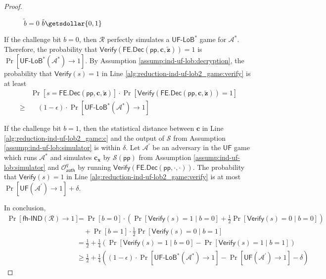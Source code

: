 \begin{proof}
\begin{figure}[h]
\begin{minipage}[t]{0.5\linewidth}
\begin{algorithm}[H]
\begin{algorithmic}[1]
		 \label{alg:reduction-ind-uf-lob2_game:verify}
			\State \Return $\tilde{b} = 0$
		\Else
			\State \Return $\tilde{b} \getsdollar \{0, 1\}$
		\EndIf

	\end{algorithmic}
	\end{algorithm}
	\end{minipage}
	
\label{fig:reduction-ind-uf-lob2_game}
\end{figure}

If the challenge bit $b = 0$, then $\mathcal{R}$ perfectly simulates a $\textsf{UF-LoB}^*$ game for $\mathcal{A}^*$. Therefore, the probability that $\textsf{Verify}(\textsf{FE.Dec}(\textsf{pp}, \mathbf{c}, \mathbf{\tilde{z}})) = 1$ is $\Pr[\textsf{UF-LoB}^*(\mathcal{A}^*) \to 1]$. By Assumption \ref{assump:ind-uf-lob:decryption}, the probability that $\textsf{Verify}(s) = 1$ in Line \ref{alg:reduction-ind-uf-lob2_game:verify} is at least
\begin{align*}
	& \Pr \left[ s = \textsf{FE.Dec}(\textsf{pp}, \mathbf{c}, \mathbf{\tilde{z}}) \right]  \cdot \Pr \left[ \textsf{Verify}(\textsf{FE.Dec}(\textsf{pp}, \mathbf{c}, \mathbf{\tilde{z}})) = 1 \right] \\
	\geq & \quad (1 - \epsilon) \cdot \Pr[\textsf{UF-LoB}^*(\mathcal{A}^*) \to 1]
\end{align*}

	If the challenge bit $b = 1$, then the statistical distance between $\mathbf{c}$ in Line \ref{alg:reduction-ind-uf-lob2_game:c} and the output of $\mathcal{S}$ from Assumption \ref{assump:ind-uf-lob:simulator} is within $\delta$. Let $\mathcal{A}^\prime$ be an adversary in the $\textsf{UF}$ game which runs $\mathcal{A}^*$ and simulates $\mathbf{c_x}$ by $\mathcal{S}(\textsf{pp})$ from Assumption \ref{assump:ind-uf-lob:simulator} and $\mathcal{O}_{\textsf{auth}}^q$ by running $\textsf{Verify}(\textsf{FE.Dec}(\textsf{pp}, \cdot, \cdot))$. The probability that $\textsf{Verify}(s) = 1$ in Line \ref{alg:reduction-ind-uf-lob2_game:verify} is at most $\Pr[\textsf{UF}(\mathcal{A}^\prime) \to 1] + \delta$.


In conclusion,
\begin{align*}
	\Pr[\textsf{fh-IND}(\mathcal{R}) \to 1] 
	&= \Pr[b = 0] \cdot \left( \Pr[\textsf{Verify}(s) = 1 \mid b = 0] + \frac{1}{2} \Pr[\textsf{Verify}(s) = 0 \mid b = 0] \right) \\
	&\quad + \Pr[b = 1] \cdot \frac{1}{2} \Pr[\textsf{Verify}(s) = 0 \mid b = 1] \\
	&= \frac{1}{2} + \frac{1}{4} \left( \Pr[\textsf{Verify}(s) = 1 \mid b = 0] - \Pr[\textsf{Verify}(s) = 1 \mid b = 1] \right) \\
	&\geq \frac{1}{2} + \frac{1}{4} \left( (1-\epsilon) \cdot \Pr[\textsf{UF-LoB}^*(\mathcal{A}^*) \to 1] - \Pr[\textsf{UF}(\mathcal{A}^\prime) \to 1] - \delta \right)
\end{align*}


\end{proof}
